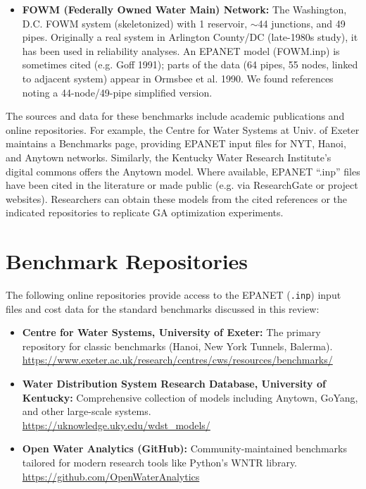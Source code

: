 \documentclass[12pt, a4paper]{article}
\begin{document}
\begin{itemize}
	\item \textbf{FOWM (Federally Owned Water Main) Network:} The Washington, D.C. FOWM system (skeletonized) with 1 reservoir, $\sim$44 junctions, and 49 pipes\cite{ref21}. Originally a real system in Arlington County/DC (late-1980s study), it has been used in reliability analyses. An EPANET model (FOWM.inp) is sometimes cited (e.g. Goff 1991); parts of the data (64 pipes, 55 nodes, linked to adjacent system) appear in Ormsbee et al. 1990. We found references noting a 44-node/49-pipe simplified version\cite{ref21}.
\end{itemize}

The sources and data for these benchmarks include academic publications and online repositories. For example, the Centre for Water Systems at Univ. of Exeter maintains a Benchmarks page, providing EPANET input files for NYT, Hanoi, and Anytown networks\cite{ref19}. Similarly, the Kentucky Water Research Institute's digital commons offers the Anytown model\cite{ref20}. Where available, EPANET ``.inp'' files have been cited in the literature or made public (e.g. via ResearchGate or project websites). Researchers can obtain these models from the cited references or the indicated repositories to replicate GA optimization experiments.

\section*{Benchmark Repositories}

The following online repositories provide access to the EPANET (\texttt{.inp}) input files and cost data for the standard benchmarks discussed in this review:

\begin{itemize}
	\item \textbf{Centre for Water Systems, University of Exeter:} The primary repository for classic benchmarks (Hanoi, New York Tunnels, Balerma). \\ \url{https://www.exeter.ac.uk/research/centres/cws/resources/benchmarks/}
	\item \textbf{Water Distribution System Research Database, University of Kentucky:} Comprehensive collection of models including Anytown, GoYang, and other large-scale systems. \\ \url{https://uknowledge.uky.edu/wdst_models/}
	\item \textbf{Open Water Analytics (GitHub):} Community-maintained benchmarks tailored for modern research tools like Python's WNTR library. \\ \url{https://github.com/OpenWaterAnalytics}
\end{itemize}
\end{document}
